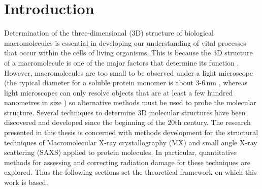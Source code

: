 \chapter{Introduction}
\label{chap:Introduction - Intro chapter}
Determination of the three-dimensional (3D) structure of biological macromolecules is essential in developing our understanding of vital processes that occur within the cells of living organisms.
This is because the 3D structure of a macromolecule is one of the major factors that determine its function \cite[s~3.6]{berg2002,hegyi1999}.
However, macromolecules are too small to be observed under a light microscope (the typical diameter for a soluble protein monomer is about 3-6$\,$nm \cite{Philips2015}, whereas light microscopes can only resolve objects that are at least a few hundred nanometres in size \cite[p~54]{starr2010}) so alternative methods must be used to probe the molecular structure.
Several techniques to determine 3D molecular structures have been discovered and developed since the beginning of the 20th century.
The research presented in this thesis is concerned with methods development for the structural techniques of Macromolecular X-ray crystallography (MX) and small angle X-ray scattering (SAXS) applied to protein molecules.
In particular, quantitative methods for assessing and correcting radiation damage for these techniques are explored.
Thus the following sections set the theoretical framework on which this work is based.
